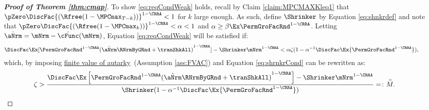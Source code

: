 \documentclass[\econtexRoot/BufferStockTheory]{subfiles}
\begin{document}
\begin{proof}[\textbf{Proof of Theorem \ref{thm:cmap}}]
To show \eqref{eq:reqCondWeak} holds, recall by Claim \ref{claim:MPCMAXKleq1} that $\pZero \DiscFac {(\Rfree (1-\MPCmax_{T-k}))}^{1-\CRRA}   < 1$ for $k$ large enough. As such, define $\Shrinker$ by Equation \eqref{eq:shnkrdef} and note that $\pZero \DiscFac {(\Rfree (1-\MPCmax_{k}))}^{1-\CRRA} < \alpha < 1$ and $\alpha\geq \beta\Ex\PermGroFacRnd^{1-\CRRA}$. Letting $\hat{\aNrm} = \mNrm - \hat{\cFunc}(\mNrm)$, Equation \eqref{eq:reqCondWeak} will be satisfied if:
%
\begin{align*}
  \DiscFac \Ex [{\PermGroFacRnd^{1-\CRRA }}{(\hat{\aNrm}\RNrmByGRnd+\tranShkAll)}^{1-\CRRA}]-\Shrinker\mNrm^{1-\CRRA}  & < \alpha\zeta(1-\alpha^{-1}\DiscFac\Ex {\PermGroFacRnd^{1-\CRRA }}),
\end{align*}
%
which, by imposing \hyperlink{FVAC}{finite value of autarky}~(Assumption \ref{ass:FVAC}) and Equation \eqref{eq:shrnkrCond} can be rewritten as:
%
\begin{equation}\begin{gathered}\begin{aligned}
      \zeta >\frac{\DiscFac \Ex\left[\PermGroFacRnd^{1-\CRRA}{(\hat{\aNrm}\RNrmByGRnd +\tranShkAll)}^{1-\CRRA}\right]- \Shrinker\mNrm^{1-\CRRA}}{\Shrinker(1-\alpha^{-1}\DiscFac\Ex {\PermGroFacRnd^{1-\CRRA }})}= \colon\bar{\bar{M}} \label{eq:KeyCondition}.
    \end{aligned}\end{gathered}\end{equation}


\end{proof}
\end{document}
